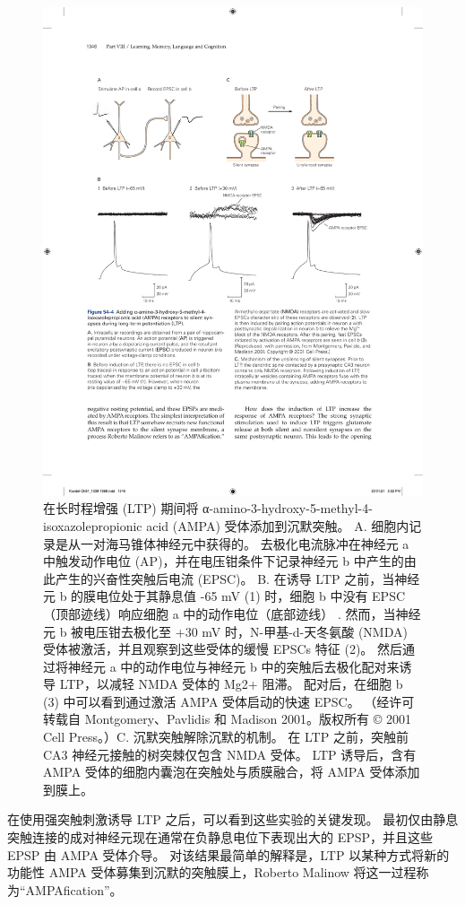\begin{figure}[htbp]
	\centering
	\includegraphics[width=0.85\linewidth]{chap54/fig_54_4}
	\caption{在长时程增强 (LTP) 期间将 α-amino-3-hydroxy-5-methyl-4-isoxazolepropionic acid (AMPA) 受体添加到沉默突触。 A. 细胞内记录是从一对海马锥体神经元中获得的。 去极化电流脉冲在神经元 a 中触发动作电位 (AP)，并在电压钳条件下记录神经元 b 中产生的由此产生的兴奋性突触后电流 (EPSC)。 B. 在诱导 LTP 之前，当神经元 b 的膜电位处于其静息值 -65 mV (1) 时，细胞 b 中没有 EPSC（顶部迹线）响应细胞 a 中的动作电位（底部迹线） . 然而，当神经元 b 被电压钳去极化至 +30 mV 时，N-甲基-d-天冬氨酸 (NMDA) 受体被激活，并且观察到这些受体的缓慢 EPSCs 特征 (2)。 然后通过将神经元 a 中的动作电位与神经元 b 中的突触后去极化配对来诱导 LTP，以减轻 NMDA 受体的 Mg2+ 阻滞。 配对后，在细胞 b (3) 中可以看到通过激活 AMPA 受体启动的快速 EPSC。 （经许可转载自 Montgomery、Pavlidis 和 Madison 2001。版权所有 © 2001 Cell Press。）C. 沉默突触解除沉默的机制。 在 LTP 之前，突触前 CA3 神经元接触的树突棘仅包含 NMDA 受体。 LTP 诱导后，含有 AMPA 受体的细胞内囊泡在突触处与质膜融合，将 AMPA 受体添加到膜上。}
	\label{fig:54_4}
\end{figure}

在使用强突触刺激诱导 LTP 之后，可以看到这些实验的关键发现。 最初仅由静息突触连接的成对神经元现在通常在负静息电位下表现出大的 EPSP，并且这些 EPSP 由 AMPA 受体介导。 对该结果最简单的解释是，LTP 以某种方式将新的功能性 AMPA 受体募集到沉默的突触膜上，Roberto Malinow 将这一过程称为“AMPAfication”。


